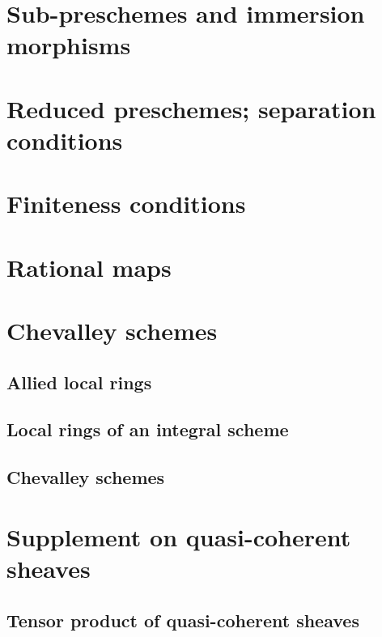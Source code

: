 \documentclass[10pt,oneside]{amsart}
\begin{document}
    \section{Sub-preschemes and immersion morphisms}

    \section{Reduced preschemes; separation conditions}

    \section{Finiteness conditions}

    \section{Rational maps}

    \section{Chevalley schemes}

        \subsection{Allied local rings}
        

        \subsection{Local rings of an integral scheme}
        

        \subsection{Chevalley schemes}
        

    \section{Supplement on quasi-coherent sheaves}

        \subsection{Tensor product of quasi-coherent sheaves}
        
\end{document}
